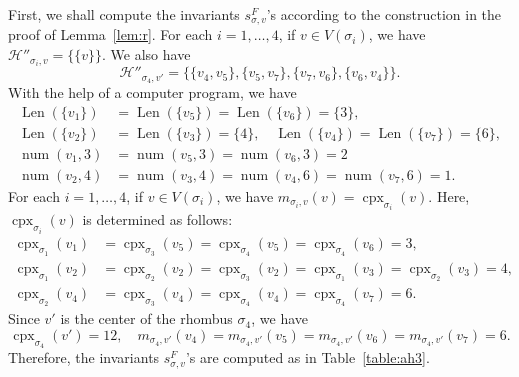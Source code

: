 First, we shall compute the invariants $s^F _{\sigma, v}$'s according to the construction in the proof of Lemma~\ref{lem:r}. 
For each $i = 1, \ldots , 4$, if $v \in V(\sigma _i)$, we have $\mathcal{H}''_{\sigma _i, v} = \{\{ v \}\}$. 
We also have 
\[
\mathcal{H}''_{\sigma _4, v'} = \{ \{ v_4, v_5 \}, \{ v_5, v_7 \}, \{ v_7, v_6 \}, \{ v_6, v_4 \} \}. 
\]
With the help of a computer program, we have 
\begin{align*}
\operatorname{Len}(\{ v_1 \}) &= 
\operatorname{Len}(\{ v_5 \}) = 
\operatorname{Len}(\{ v_6 \}) =  \{ 3 \}, \\
\operatorname{Len}(\{ v_2 \}) &= 
\operatorname{Len}(\{ v_3 \}) = \{ 4 \}, \quad
\operatorname{Len}(\{ v_4 \}) = 
\operatorname{Len}(\{ v_7 \}) = \{ 6 \}, \\ 
\operatorname{num}(v_1, 3) &= 
\operatorname{num}(v_5, 3) = 
\operatorname{num}(v_6, 3) = 2 \\
\operatorname{num}(v_2, 4) &= 
\operatorname{num}(v_3, 4) = 
\operatorname{num}(v_4, 6) = 
\operatorname{num}(v_7, 6) = 1. 
\end{align*}
For each $i = 1, \ldots , 4$, if $v \in V(\sigma _i)$, 
we have $m_{\sigma _i , v } (v) = \operatorname{cpx}_{\sigma _i}(v)$. 
Here, $\operatorname{cpx}_{\sigma _i}(v)$ is determined as follows: 
\begin{align*}
\operatorname{cpx}_{\sigma _1}(v_1) &= 
\operatorname{cpx}_{\sigma _3}(v_5) = 
\operatorname{cpx}_{\sigma _4}(v_5) = 
\operatorname{cpx}_{\sigma _4}(v_6) = 3, \\
\operatorname{cpx}_{\sigma _1}(v_2) &= 
\operatorname{cpx}_{\sigma _2}(v_2) = 
\operatorname{cpx}_{\sigma _3}(v_2) = 
\operatorname{cpx}_{\sigma _1}(v_3) = 
\operatorname{cpx}_{\sigma _2}(v_3) = 4, \\
\operatorname{cpx}_{\sigma _2}(v_4) &= 
\operatorname{cpx}_{\sigma _3}(v_4) = 
\operatorname{cpx}_{\sigma _4}(v_4) = 
\operatorname{cpx}_{\sigma _4}(v_7) = 6. 
\end{align*}
Since $v'$ is the center of the rhombus $\sigma _4$, we have 
\[
\operatorname{cpx}_{\sigma _4}(v')=12, \quad 
m_{\sigma _4 , v'} (v_4) = m_{\sigma _4 , v'} (v_5) = m_{\sigma _4 , v'} (v_6) = m_{\sigma _4 , v'} (v_7) = 6. 
\]
Therefore, the invariants $s_{\sigma, v} ^F$'s are computed as in Table~\ref{table:ah3}. 

